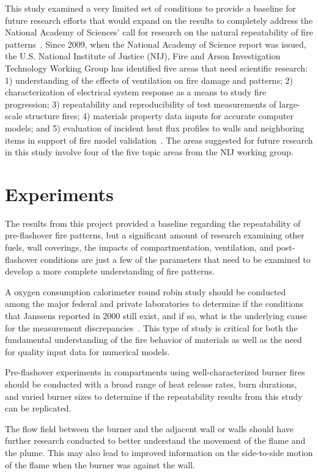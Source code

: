 \documentclass[twoside]{uocthesis}
\begin{document}
{This study examined a very limited set of conditions to provide a baseline for future research efforts that would expand on the results to completely address the National Academy of Sciences' call for research on the natural repeatability of fire patterns~\cite{Forensic:2009}.   Since 2009, when the National Academy of Science report was issued, the U.S. National Institute of Justice (NIJ), Fire and Arson Investigation Technology Working Group has identified five areas that need scientific research: 1) understanding of the effects of ventilation on fire damage and patterns; 2) characterization of electrical system response as a means to study fire progression; 3) repeatability and reproducibility of test measurements of large-scale structure fires; 4) materials property data inputs for accurate computer models; and 5) evaluation of incident heat flux profiles to walls and neighboring items in support of fire model validation~\cite{NIJ:2016}.  The areas suggested for future research in this study involve four of the five topic areas from the NIJ working group.   

\section{Experiments}

The results from this project provided a baseline regarding the repeatability of pre-flashover fire patterns, but a significant amount of research examining other fuels, wall coverings, the impacts of compartmentation, ventilation, and post-flashover conditions are just a few of the parameters that need to be examined to develop a more complete understanding of fire patterns.

A oxygen consumption calorimeter round robin study should be conducted among the major federal and private laboratories to determine if the conditions that Janssens reported in 2000 still exist, and if so, what is the underlying cause for the measurement discrepancies~\cite{Janssens:2002}. This type of study is critical for both the fundamental understanding of the fire behavior of materials as well as the need for quality input data for numerical models. 

Pre-flashover experiments in compartments using well-characterized burner fires should be conducted with a broad range of heat release rates, burn durations, and varied burner sizes to determine if the repeatability results from this study can be replicated. 

The flow field between the burner and the adjacent wall or walls should have further research conducted to better understand the movement of the flame and the plume.  This may also lead to improved information on the side-to-side motion of the flame when the burner was against the wall.  

}
\end{document}
